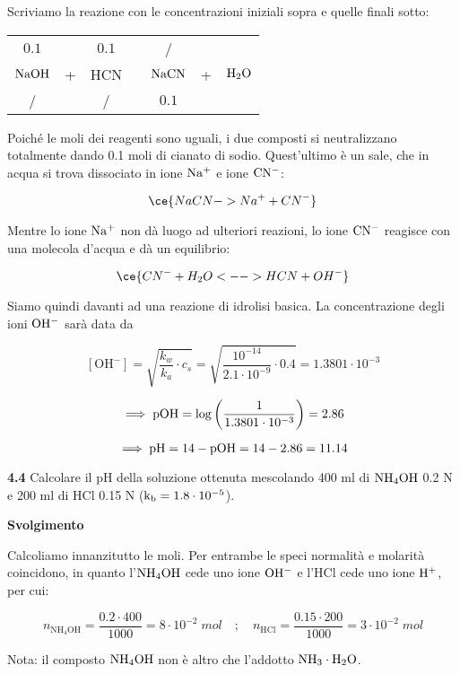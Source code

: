 Scriviamo la reazione con le concentrazioni iniziali sopra e quelle finali sotto:

\begin{center}
    \begin{tabular}{ccccccc}
        $0.1$ &  & $0.1$ & & / &&\\
        $\rm NaOH$ & + & HCN & \ce{->} & $\rm NaCN$ & + & $\rm H_2O$\\
        / &  &  / & & $0.1$ &&\\
    \end{tabular}
\end{center}

Poiché le moli dei reagenti sono uguali, i due composti si neutralizzano totalmente dando 0.1 moli di cianato di sodio. Quest'ultimo è un sale, che in acqua si trova dissociato in ione $\rm Na^+$ e ione $\rm CN^-$:

$$\ce{NaCN -> Na^+ + CN^-}$$

Mentre lo ione $\rm Na^+$ non dà luogo ad ulteriori reazioni, lo ione $\rm CN^-$ reagisce con una molecola d'acqua e dà un equilibrio:

$$\ce{CN^- + H_2O <--> HCN + OH^-}$$

Siamo quindi davanti ad una reazione di idrolisi basica. La concentrazione degli ioni $\rm OH^-$ sarà data da

$$[\text{OH}^-]
=\sqrt{\frac{k_w}{k_a}\cdot c_s}
=\sqrt{\frac{10^{-14}}{2.1 \cdot 10^{-9}} \cdot 0.4}
=1.3801 \cdot 10^{-3}$$

$$\implies \rm pOH
=\log{\left(\frac{1}{1.3801 \cdot 10^{-3}}\right)}
=2.86$$

$$\implies \rm pH=14-pOH=14-2.86=11.14$$

\textbf{4.4} Calcolare il pH della soluzione ottenuta mescolando 400 ml di $\rm NH_4OH$ 0.2 N e 200 ml di HCl 0.15 N ($\rm k_b = 1.8 \cdot 10^{-5}$).

\vspace{0.2cm}\large\textbf{Svolgimento}\normalsize

\vspace{0.2cm}Calcoliamo innanzitutto le moli. Per entrambe le speci normalità e molarità coincidono, in quanto l'$\rm NH_4OH$ cede uno ione $\rm OH^-$ e l'HCl cede uno ione $\rm H^+$, per cui:

$$n_{\text{NH}_4\text{OH}}=\frac{0.2 \cdot 400}{1000}=8 \cdot 10^{-2} \; mol
\quad ; \quad
n_{\text{HCl}}=\frac{0.15 \cdot 200}{1000}=3 \cdot 10^{-2} \; mol$$

Nota: il composto $\rm NH_4OH$ non è altro che l'addotto $\rm NH_3 \cdot H_2O$.

